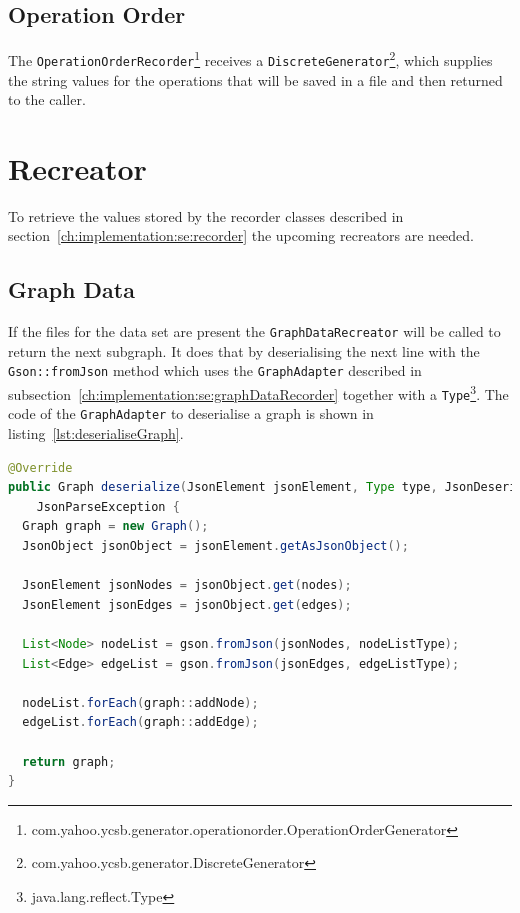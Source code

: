 \subsection{Operation Order}
\label{ch:implementation:se:operationOrderRecorder}
The \texttt{OperationOrderRecorder}\footnote{com.yahoo.ycsb.generator.operationorder.OperationOrderGenerator} receives a \texttt{DiscreteGenerator}\footnote{com.yahoo.ycsb.generator.DiscreteGenerator},
which supplies the string values for the operations that will be saved in a file and then returned to the caller.

\section{Recreator}
\label{ch:implementation:se:recreator}
To retrieve the values stored by the recorder classes described in section~\ref{ch:implementation:se:recorder} the upcoming recreators are needed.

\subsection{Graph Data}
If the files for the data set are present the \texttt{GraphDataRecreator} will be called to return the next subgraph.
It does that by deserialising the next line with the \texttt{Gson::fromJson} method which uses the \texttt{GraphAdapter} described in subsection~\ref{ch:implementation:se:graphDataRecorder} together with a \texttt{Type}\footnote{java.lang.reflect.Type}.
The code of the \texttt{GraphAdapter} to deserialise a graph is shown in listing~\ref{lst:deserialiseGraph}.

\begin{lstlisting}[language=Java,label={lst:deserialiseGraph},caption={Deserialisation of a graph object.}]
@Override
public Graph deserialize(JsonElement jsonElement, Type type, JsonDeserializationContext context) throws
    JsonParseException {
  Graph graph = new Graph();
  JsonObject jsonObject = jsonElement.getAsJsonObject();

  JsonElement jsonNodes = jsonObject.get(nodes);
  JsonElement jsonEdges = jsonObject.get(edges);

  List<Node> nodeList = gson.fromJson(jsonNodes, nodeListType);
  List<Edge> edgeList = gson.fromJson(jsonEdges, edgeListType);

  nodeList.forEach(graph::addNode);
  edgeList.forEach(graph::addEdge);

  return graph;
}
\end{lstlisting}

